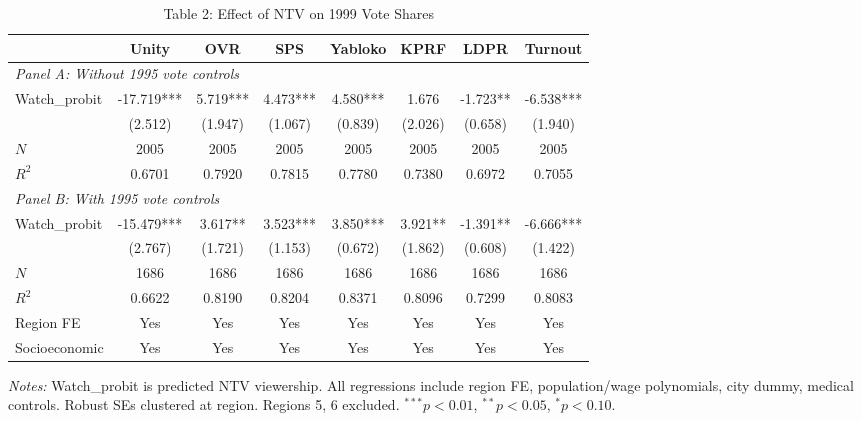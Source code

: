 \begin{table}[htbp]
\centering
\caption{Table 2: Effect of NTV on 1999 Vote Shares}
\label{tab:enik_table2}
\begin{adjustbox}{max width=\textwidth}
\begin{tabular}{lccccccc}
\toprule
 & Unity & OVR & SPS & Yabloko & KPRF & LDPR & Turnout \\
\midrule
\multicolumn{8}{l}{\textit{Panel A: Without 1995 vote controls}} \\
Watch\_probit & -17.719*** & 5.719*** & 4.473*** & 4.580*** & 1.676 & -1.723** & -6.538*** \\
 & (2.512) & (1.947) & (1.067) & (0.839) & (2.026) & (0.658) & (1.940) \\
$N$ & 2005 & 2005 & 2005 & 2005 & 2005 & 2005 & 2005 \\
$R^2$ & 0.6701 & 0.7920 & 0.7815 & 0.7780 & 0.7380 & 0.6972 & 0.7055 \\
\midrule
\multicolumn{8}{l}{\textit{Panel B: With 1995 vote controls}} \\
Watch\_probit & -15.479*** & 3.617** & 3.523*** & 3.850*** & 3.921** & -1.391** & -6.666*** \\
 & (2.767) & (1.721) & (1.153) & (0.672) & (1.862) & (0.608) & (1.422) \\
$N$ & 1686 & 1686 & 1686 & 1686 & 1686 & 1686 & 1686 \\
$R^2$ & 0.6622 & 0.8190 & 0.8204 & 0.8371 & 0.8096 & 0.7299 & 0.8083 \\
\midrule
Region FE & Yes & Yes & Yes & Yes & Yes & Yes & Yes \\
Socioeconomic & Yes & Yes & Yes & Yes & Yes & Yes & Yes \\
\bottomrule
\end{tabular}
\end{adjustbox}
\parbox{\textwidth}{\footnotesize\textit{Notes:} Watch\_probit is predicted NTV viewership. All regressions include region FE, population/wage polynomials, city dummy, medical controls. Robust SEs clustered at region. Regions 5, 6 excluded. $^{***}p<0.01$, $^{**}p<0.05$, $^{*}p<0.10$.}
\end{table}